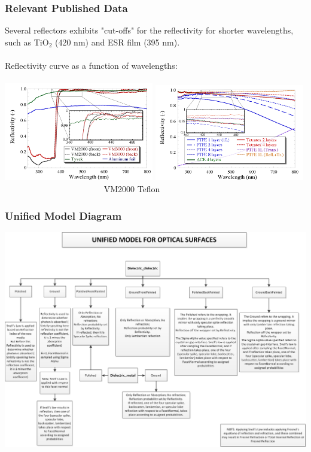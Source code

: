 \documentclass[xcolor=x11names, compress, handout]{beamer}
\renewcommand{\(}{\begin{columns}}
\renewcommand{\)}{\end{columns}}
\newcommand{\<}[1]{\begin{column}{#1}}
\renewcommand{\>}{\end{column}}
\begin{document}
\begin{frame}
\frametitle{Relevant Published Data}
Several reflectors exhibits "cut-offs" for the reflectivity for shorter wavelengths, such as TiO$_2$ (420 nm) and ESR film (395 nm). \cite{janecek_2012} \\
\ \\
Reflectivity curve as a function of wavelengths: \\
\ \\
\includegraphics[width=0.49\textwidth, height=0.45\textheight]{images/vm2000_reflectivity_curve1}
\includegraphics[width=0.49\textwidth, height=0.45\textheight]{images/teflon_reflectivity_curve1}
\scriptsize \flushleft~~~~~~~~~~~~~~~~~~~~~~~ VM2000 \cite{janecek_2012}  \hspace{5cm} Teflon \cite{janecek_2012} \hspace{3cm}
\end{frame}

\begin{frame}
  \frametitle{Unified Model Diagram}
  \centering
  \includegraphics[width=\textwidth, height=0.9\textheight]{images/UNIFIED_model_diagram.png}
\end{frame}

\end{document}
